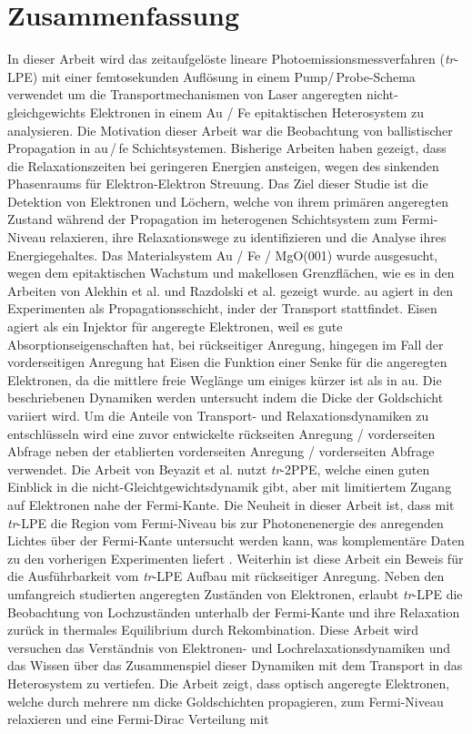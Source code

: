 \documentclass[a4paper,12pt,twoside]{article}
\begin{document}
    \section*{Zusammenfassung}
        \label{Zchap}
\renewcommand{\baselinestretch}{1.2}\normalsize
In dieser Arbeit wird das zeitaufgelöste lineare Photoemissionsmessverfahren (\textit{tr}-LPE) mit einer femtosekunden Auflösung in einem Pump/\,Probe-Schema verwendet um die Transportmechanismen von Laser angeregten nicht-gleichgewichts Elektronen in einem Au / Fe epitaktischen Heterosystem zu analysieren. Die Motivation dieser Arbeit war die Beobachtung von ballistischer Propagation in \gls{au}\,/\,\gls{fe} Schichtsystemen. Bisherige Arbeiten haben gezeigt, dass die Relaxationszeiten bei geringeren Energien ansteigen, wegen des sinkenden Phasenraums für Elektron-Elektron Streuung. Das Ziel dieser Studie ist die Detektion von Elektronen und Löchern, welche von ihrem primären angeregten Zustand während der Propagation im heterogenen Schichtsystem zum Fermi-Niveau relaxieren, ihre Relaxationswege zu identifizieren und die Analyse ihres Energiegehaltes. Das Materialsystem Au / Fe / MgO(001) wurde ausgesucht, wegen dem epitaktischen Wachstum und makellosen Grenzflächen, wie es in den Arbeiten von Alekhin et al.\cite{Alekhin2017} und Razdolski et al.\cite{Razdolski2017} gezeigt wurde. \gls{au} agiert in den Experimenten als Propagationsschicht, inder der Transport stattfindet. Eisen agiert als ein Injektor für angeregte Elektronen, weil es gute Absorptionseigenschaften hat, bei rückseitiger Anregung, hingegen im Fall der vorderseitigen Anregung hat Eisen die Funktion einer Senke für die angeregten Elektronen, da die mittlere freie Weglänge um einiges kürzer ist als in \gls{au}. Die beschriebenen Dynamiken werden untersucht indem die Dicke der Goldschicht variiert wird. Um die Anteile von Transport- und Relaxationsdynamiken zu entschlüsseln wird eine zuvor entwickelte rückseiten Anregung / vorderseiten Abfrage neben der etablierten vorderseiten Anregung / vorderseiten Abfrage verwendet. Die Arbeit von Beyazit et al. nutzt \textit{tr}-2PPE, welche einen guten Einblick in die nicht-Gleichtgewichtsdynamik gibt, aber mit limitiertem Zugang auf Elektronen nahe der Fermi-Kante. Die Neuheit in dieser Arbeit ist, dass mit \textit{tr}-LPE die Region vom Fermi-Niveau bis zur Photonenenergie des anregenden Lichtes über der Fermi-Kante untersucht werden kann, was komplementäre Daten zu den vorherigen Experimenten liefert \cite{beyazit2019}. Weiterhin ist diese Arbeit ein Beweis für die Ausführbarkeit vom \textit{tr}-LPE Aufbau mit rückseitiger Anregung. Neben den umfangreich studierten angeregten Zuständen von Elektronen, erlaubt \textit{tr}-LPE die Beobachtung von Lochzuständen unterhalb der Fermi-Kante und ihre Relaxation zurück in thermales Equilibrium durch Rekombination. Diese Arbeit wird versuchen das Verständnis von Elektronen- und Lochrelaxationsdynamiken und das Wissen über das Zusammenspiel dieser Dynamiken mit dem Transport in das Heterosystem zu vertiefen. Die Arbeit zeigt, dass optisch angeregte Elektronen, welche durch mehrere nm dicke Goldschichten propagieren, zum Fermi-Niveau relaxieren und eine Fermi-Dirac Verteilung mit 
\end{document}
